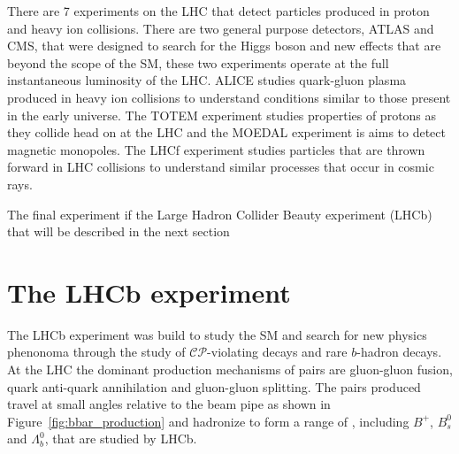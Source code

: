 There are 7 experiments on the LHC that detect particles produced in proton and heavy ion collisions. There are two general purpose detectors, ATLAS and CMS, that were designed to search for the Higgs boson and new effects that are beyond the scope of the SM, these two experiments operate at the full instantaneous luminosity of the LHC. %
ALICE studies quark-gluon plasma produced in heavy ion collisions to understand conditions similar to those present in the early universe. The TOTEM experiment studies properties of protons as they collide head on at the LHC and the MOEDAL experiment is aims to detect magnetic monopoles. The LHCf experiment studies particles that are thrown forward in LHC collisions to understand similar processes that occur in cosmic rays. %


The final experiment if the Large Hadron Collider Beauty experiment (LHCb) that will be described in the next section

\section{The LHCb experiment}
\label{LHCb}
The LHCb experiment was build to study the SM and search for new physics phenonoma through the study of $\mathcal{CP}$-violating decays and rare $b$-hadron decays. 
At the LHC the dominant production mechanisms of \bbbar pairs are gluon-gluon fusion, quark anti-quark annihilation and gluon-gluon splitting. The \bbbar pairs produced travel at small angles relative to the beam pipe as shown in Figure~\ref{fig:bbar_production} and hadronize to form a range of \bhadrons, including $B^{+}$, $B^{0}_{s}$ and $\Lambda^{0}_{b}$, that are studied by LHCb. 

